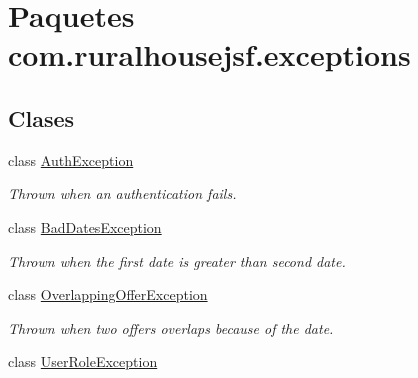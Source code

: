 \hypertarget{namespacecom_1_1ruralhousejsf_1_1exceptions}{}\section{Paquetes com.\+ruralhousejsf.\+exceptions}
\label{namespacecom_1_1ruralhousejsf_1_1exceptions}
\subsection*{Clases}
\begin{DoxyCompactItemize}
\item 
class \mbox{\hyperlink{classcom_1_1ruralhousejsf_1_1exceptions_1_1_auth_exception}{Auth\+Exception}}
\begin{DoxyCompactList}\small\item\em Thrown when an authentication fails. \end{DoxyCompactList}\item 
class \mbox{\hyperlink{classcom_1_1ruralhousejsf_1_1exceptions_1_1_bad_dates_exception}{Bad\+Dates\+Exception}}
\begin{DoxyCompactList}\small\item\em Thrown when the first date is greater than second date. \end{DoxyCompactList}\item 
class \mbox{\hyperlink{classcom_1_1ruralhousejsf_1_1exceptions_1_1_overlapping_offer_exception}{Overlapping\+Offer\+Exception}}
\begin{DoxyCompactList}\small\item\em Thrown when two offers overlaps because of the date. \end{DoxyCompactList}\item 
class \mbox{\hyperlink{classcom_1_1ruralhousejsf_1_1exceptions_1_1_user_role_exception}{User\+Role\+Exception}}
\end{DoxyCompactItemize}
